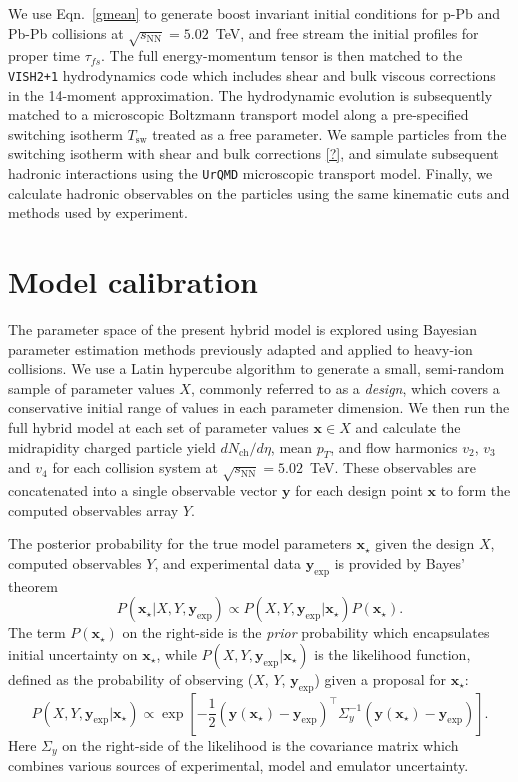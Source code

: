 \documentclass[3p,times,procedia]{elsarticle}
\newcommand{\sqrts}{\sqrt{s_\mathrm{NN}}}
\begin{document}
We use Eqn.~\eqref{gmean} to generate boost invariant initial conditions for p-Pb and Pb-Pb collisions at $\sqrts=5.02$~TeV, and free stream the initial profiles for proper time $\tau_{fs}$.
The full energy-momentum tensor is then matched to the \texttt{VISH2+1} hydrodynamics code which includes shear and bulk viscous corrections in the 14-moment approximation.
The hydrodynamic evolution is subsequently matched to a microscopic Boltzmann transport model along a pre-specified switching isotherm $T_\text{sw}$ treated as a free parameter.
We sample particles from the switching isotherm with shear and bulk corrections \ref{?}, and simulate subsequent hadronic interactions using the \texttt{UrQMD} microscopic transport model.
Finally, we calculate hadronic observables on the particles using the same kinematic cuts and methods used by experiment.

\section{Model calibration}

The parameter space of the present hybrid model is explored using Bayesian parameter estimation methods previously adapted and applied to heavy-ion collisions.
We use a Latin hypercube algorithm to generate a small, semi-random sample of parameter values $X$, commonly referred to as a \emph{design}, which covers a conservative initial range of values in each parameter dimension.
We then run the full hybrid model at each set of parameter values $\mathbf{x} \in X$ and calculate the midrapidity charged particle yield $dN_\text{ch}/d\eta$, mean $p_T$, and flow harmonics $v_2$, $v_3$ and $v_4$ for each collision system at $\sqrts=5.02$~TeV.
These observables are concatenated into a single observable vector $\mathbf{y}$ for each design point $\mathbf{x}$ to form the computed observables array $Y$.

The posterior probability for the true model parameters $\mathbf{x_\star}$ given the design $X$, computed observables $Y$, and experimental data $\mathbf{y}_\mathrm{exp}$ is provided by Bayes' theorem
\begin{equation}
  \label{posterior}
  P(\mathbf{x_\star}| X, Y, \mathbf{y}_\mathrm{exp}) \propto P(X, Y, \mathbf{y}_\mathrm{exp} | \mathbf{x_\star}) P(\mathbf{x_\star}).
\end{equation}
The term $P(\mathbf{x_\star})$ on the right-side is the \emph{prior} probability which encapsulates initial uncertainty on $\mathbf{x_\star}$, while $P(X, Y, \mathbf{y}_\mathrm{exp} | \mathbf{x_\star})$ is the likelihood function, defined as the probability of observing ($X$, $Y$, $\mathbf{y}_\text{exp}$) given a proposal for $\mathbf{x}_\star$:
\begin{equation}
  P(X, Y, \mathbf{y}_\mathrm{exp} | \mathbf{x_\star}) \propto \exp \left[ -\frac{1}{2}(\mathbf{y}(\mathbf{x_\star}) - \mathbf{y}_\mathrm{exp})^\top \Sigma_y^{-1} (\mathbf{y}(\mathbf{x_\star}) - \mathbf{y}_\mathrm{exp}) \right].
\end{equation}
Here $\Sigma_y$ on the right-side of the likelihood is the covariance matrix which combines various sources of experimental, model and emulator uncertainty.
\end{document}
